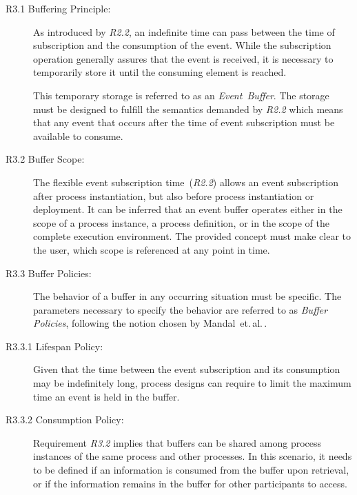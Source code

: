 \begin{description}
	\item[R3.1 Buffering Principle:]
	As introduced by \textit{R2.2}, an indefinite time can pass between the time of subscription and the consumption of the event.
	While the subscription operation generally assures that the event is received, it is necessary to temporarily store it until the consuming element is reached.
	
	This temporary storage is referred to as an \textit{Event~Buffer}.
	The storage must be designed to fulfill the semantics demanded by \textit{R2.2} which means that any event that occurs after the time of event subscription must be available to consume.
	
	\item[R3.2 Buffer Scope:]
	The flexible event subscription time~(\textit{R2.2}) allows an event subscription after process instantiation, but also before process instantiation or deployment.
	It can be inferred that an event buffer operates either in the scope of a process instance, a process definition, or in the scope of the complete execution environment.
	The provided concept must make clear to the user, which scope is referenced at any point in time.
	
	\item[R3.3 Buffer Policies:]
	The behavior of a buffer in any occurring situation must be specific.
	The parameters necessary to specify the behavior are referred to as \textit{Buffer Policies}, following the notion chosen by  Mandal~et.\,al.\,\cite{mandal:2017}.
	
	\item[R3.3.1 Lifespan Policy:]
	Given that the time between the event subscription and its consumption may be indefinitely long, process designs can require to limit the maximum time an event is held in the buffer.
	
	\item[R3.3.2 Consumption Policy:]
	Requirement \textit{R3.2} implies that buffers can be shared among process instances of the same process and other processes.
	In this scenario, it needs to be defined if an information is consumed from the buffer upon retrieval, or if the information remains in the buffer for other participants to access. 
		

\end{description}
